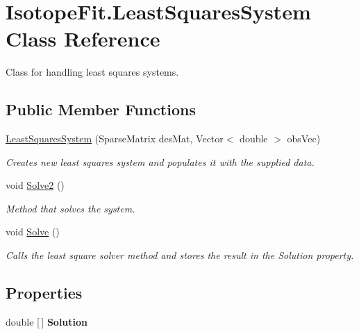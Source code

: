 \hypertarget{class_isotope_fit_1_1_least_squares_system}{}\section{Isotope\+Fit.\+Least\+Squares\+System Class Reference}
\label{class_isotope_fit_1_1_least_squares_system}


Class for handling least squares systems.  


\subsection*{Public Member Functions}
\begin{DoxyCompactItemize}
\item 
\hyperlink{class_isotope_fit_1_1_least_squares_system_aec0b3973e7239d006b752a4e079f80d0}{Least\+Squares\+System} (Sparse\+Matrix des\+Mat, Vector$<$ double $>$ obs\+Vec)
\begin{DoxyCompactList}\small\item\em Creates new least squares system and populates it with the supplied data. \end{DoxyCompactList}\item 
void \hyperlink{class_isotope_fit_1_1_least_squares_system_a1066b54298eca0682a56fd0275ae8e46}{Solve2} ()
\begin{DoxyCompactList}\small\item\em Method that solves the system. \end{DoxyCompactList}\item 
void \hyperlink{class_isotope_fit_1_1_least_squares_system_ac72b8568e9ecb97077102658f56aba3f}{Solve} ()
\begin{DoxyCompactList}\small\item\em Calls the least square solver method and stores the result in the Solution property. \end{DoxyCompactList}\end{DoxyCompactItemize}
\subsection*{Properties}
\begin{DoxyCompactItemize}
\item 
\mbox{\label{class_isotope_fit_1_1_least_squares_system_a617be79d453e62bdd056dea7d66c8a9e}} 
double \mbox{[}$\,$\mbox{]} {\bfseries Solution}
\end{DoxyCompactItemize}


